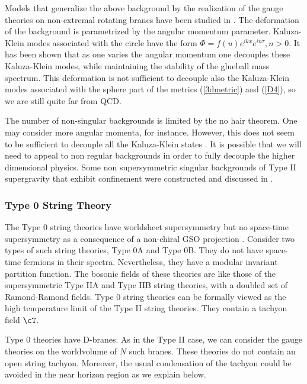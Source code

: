Models that generalize the above background by the realization of the
gauge theories on non-extremal rotating branes have been studied in
\cite{Russo:1998nc, Csaki:1999ln,Cvetic:1999rb}.  The deformation of the background
is parametrized by the angular momentum parameter.  Kaluza-Klein modes
associated with the circle have the form $\Phi = f(u)
e^{ikx}e^{in\tau}, n > 0$.  It has been shown that as one varies the
angular momentum one decouples these Kaluza-Klein modes, while
maintaining the stability of the glueball mass spectrum.  This
deformation is not sufficient to decouple also the Kaluza-Klein modes
associated with the sphere part of the metrics (\ref{3dmetric}) and
(\ref{D4}), so we are still quite far from QCD.

The number of non-singular backgrounds is limited by the no hair
theorem. One may consider more angular momenta, for instance.
However, this does not seem to be sufficient to decouple all the
Kaluza-Klein states \cite{Russo:1999rd,Russo:1999sm}.  It is possible
that we will need to appeal to non regular backgrounds in order to
fully decouple the higher dimensional physics.  Some non
supersymmetric singular backgrounds of Type II supergravity that
exhibit confinement were constructed and discussed in
\cite{Kehagias:1999tr,Gubser:1999pk,Girardello:1999hj,Constable:1999ch}.


\subsubsection{Type 0 String Theory}

The Type 0 string theories have worldsheet supersymmetry but no
space-time supersymmetry as a consequence of a non-chiral GSO
projection \cite{Dixon:1986ba,Seiberg:1986ss}.  Consider two types of
such string theories, Type 0A and Type 0B.  They do not have
space-time fermions in their spectra. Nevertheless, they have a
modular invariant partition function.  The bosonic fields of these
theories are like those of the supersymmetric Type IIA and Type IIB
string theories, with a doubled set of Ramond-Ramond fields.  Type 0
string theories can be formally viewed as the high temperature limit of the
Type II string theories.  They contain a tachyon field $\cT$.



Type 0 theories have D-branes. As in the Type II case, we can consider
the gauge theories on the worldvolume of $N$ such branes.  These
theories do not contain an open string tachyon.  Moreover,  the usual
condensation of the tachyon could be avoided in the near horizon region
as we explain below.


